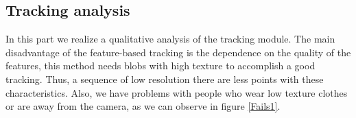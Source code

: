 \begin{table}[H]
\centering

\caption{Comparison tracking modules.}
\label{tableResultsTrack}
\end{table}

\subsection{Tracking analysis}

In this part we realize a qualitative analysis of the tracking module. The main disadvantage of the feature-based tracking is the dependence on the quality of the features, this method needs blobs with high texture to accomplish a good tracking. Thus, a sequence of low resolution there are less points with these characteristics. Also, we have problems with people who wear low texture clothes or are away from the camera, as we can observe in figure \ref{Fails1}.


